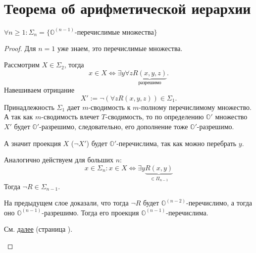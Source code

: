 \section{Теорема об арифметической иерархии}

\begin{thm}\label{thm:main_thm}
	$  \forall n \ge 1 \colon \Sigma _n = \{\mathbb{O}^{(n-1)} \text{-перечислимые множества}\}$
\end{thm}
\begin{proof}
    Для $ n = 1$ уже знаем, это перечислимые множества.
	\begin{description}
	    \item \boxed{  \subset } 
			Рассмотрим $ X \in \Sigma _2$, тогда
			\[
				x \in X \Longleftrightarrow \exists y \forall z \underbrace{R(x, y,z)}_{ \text{разрешимо}}
			.\] 
			Навешиваем отрицание
			\[
				X' := \neg \left( \forall z R(x, y, z) \right)  \in \Sigma _1
			.\] 
			Принадлежность $  \Sigma _1$ дает $ m$-сводимость к $ m$-полному перечислимому множество. А так как $ m$-сводимость влечет $ T$-сводимость, то по определению $ \mathbb{O}'$ множество $ X'$ будет $ \mathbb{O}'$-разрешимо, следовательно, его дополнение тоже $ \mathbb{O}'$-разрешимо.

			А значит проекция $X$ ($ \neg X'$) будет $ \mathbb{O}'$-перечислима, так как можно перебрать $ y$.

			Аналогично действуем для больших  $ n$: 
			\[ x \in \Sigma_n\colon x \in X \Longleftrightarrow \exists y \underbrace{R(x, y)}_{ \in \Pi _{n - 1}}\]
			Тогда $ \neg R \in \Sigma _{n-1} .$ 

		На предыдущем слое доказали, что тогда $ \neg R $ будет $ \mathbb{O}^{(n-2)}$-перечислимо, а тогда оно $ \mathbb{O}^{(n-1)}$-разрешимо. Тогда его проекция $ \mathbb{O}^{(n-1)}$-перечислима.
	    \item \boxed{\supset } 
			См. \hyperref[proof:main_thm]{далее} (страница \pageref{proof:main_thm}).
	\end{description} 
\end{proof}


